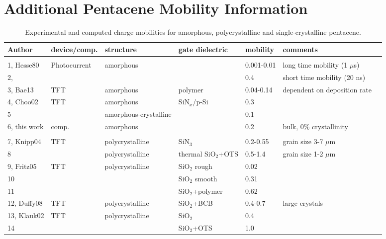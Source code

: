 \chapter{Additional Pentacene Mobility Information}
\label{ap:PentTable}
\begin{table}[h!]
	\caption{\label{tab:ap:expCompPent}Experimental and computed charge mobilities for amorphous, polycrystalline and single-crystalline pentacene.}
	\label{}
	\begin{center}
		\begin{tabular}{lllllll}
			Author & device/comp.  & structure & gate dielectric & mobility & comments  \\
			\hline \\
			1, Hesse80 & Photocurrent  & amorphous &             &  0.001-0.01 & long time mobility (1 $\mu$s)     \\
			2,               &                                                      &                    & & 0.4  & short time mobility (20 ns)   \\
			3, Bae13 & TFT  & amorphous & polymer & 0.04-0.14 & dependent on deposition rate \\
			4, Choo02 & TFT  & amorphous & SiN$_x$/p-Si & 0.3 &  \\
			5              &                             & amorphous-crystalline &  & 0.1 &   \\
			6, this work &   comp.     & amorphous &  & 0.2 &  bulk, 0\% crystallinity \\
			              \hline \\
			7, Knipp04 & TFT  & polycrystalline &  SiN$_3$ & 0.2-0.55 & grain size 3-7 $\mu$m \\
			8                   &         & polycrystalline & thermal SiO$_2$+OTS & 0.5-1.4 & grain size 1-2 $\mu$m \\
			9, Fritz05  & TFT & polycrystalline    & SiO$_2$ rough      & 0.02   & \\
			10                  &        &                             & SiO$_2$ smooth  &  0.31  & \\
			11                  &        &                        &  SiO$_2$+polymer & 0.62 & \\
			12, Duffy08 & TFT & polycrystalline &  SiO$_2$+BCB & 0.4-0.7 & large crystals \\
			13, Klauk02 & TFT & polycrystalline & SiO$_2$ & 0.4 &  \\
			14                    &       &                         & SiO$_2$+OTS  &  1.0      &      \\

\end{tabular}
\end{center}
\end{table}
